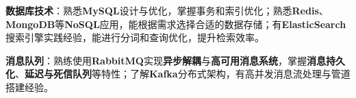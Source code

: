 \item \textbf{数据库技术}：熟悉\textbf{MySQL}设计与优化，掌握事务和索引优化；熟悉\textbf{Redis}、\textbf{MongoDB}等\textbf{NoSQL}应用，能根据需求选择合适的数据存储；有\textbf{ElasticSearch}搜索引擎实践经验，能进行分词和查询优化，提升检索效率。
\item \textbf{消息队列}：熟练使用\textbf{RabbitMQ}实现\textbf{异步解耦}与\textbf{高可用消息系统}，掌握\textbf{消息持久化}、\textbf{延迟与死信队列}等特性；了解\textbf{Kafka}分布式架构，有高并发消息流处理与管道搭建经验。